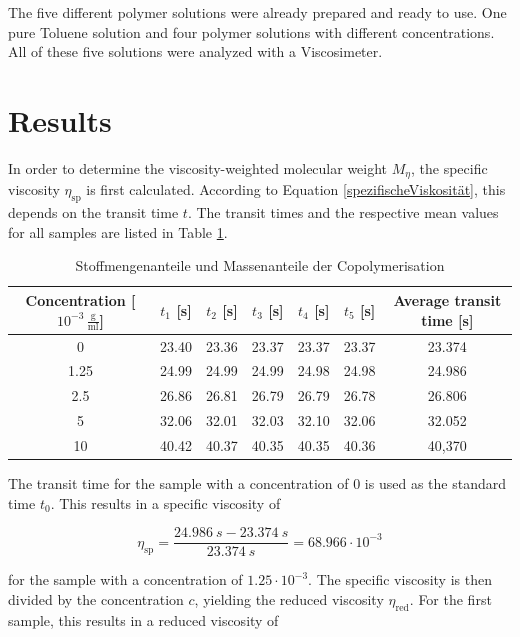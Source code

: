 \documentclass[10pt,a4paper,ngerman]{scrartcl}
\begin{document}
		The five different polymer solutions were already prepared and ready to use. 
		One pure Toluene solution and four polymer solutions with different concentrations.
		All of these five solutions were analyzed with a Viscosimeter.

\section{Results}

		In order to determine the viscosity-weighted molecular weight $M_\eta$, the specific viscosity $\eta_\text{sp}$ is first calculated. 
		According to Equation \eqref{spezifischeViskosität}, this depends on the transit time $t$. The transit times and the respective mean 
		values for all samples are listed in Table \ref{transittimes}. 
		
		\begin{table}[H]
			\centering
			\caption{Stoffmengenanteile und Massenanteile der Copolymerisation}
			\label{transittimes}
			\begin{tabular}{c|ccccc|c}
				\toprule
				Concentration [$10^{-3} \, \frac{\text{g}}{\text{ml}}$]& $t_1$ [s] & $t_2$ [s] & $t_3$ [s] & $t_4$ [s] & $t_5$ [s] & Average transit time [s]\\ 
				\midrule
				0 & 23.40 & 23.36 & 23.37 & 23.37 & 23.37 & 23.374 \\
				1.25 & 24.99 & 24.99 & 24.99 & 24.98 & 24.98 & 24.986 \\
				2.5 & 26.86 & 26.81 & 26.79 & 26.79 & 26.78 & 26.806 \\
				5 & 32.06 & 32.01 & 32.03 & 32.10 & 32.06 & 32.052 \\
				10 & 40.42 & 40.37 & 40.35 & 40.35 & 40.36 & 40,370 \\
				\bottomrule
			\end{tabular}
		\end{table}
		
		The transit time for the sample with a concentration of 0 is used as the standard time $t_0$. This results in a specific viscosity 
		of 
		
		\begin{equation*}
			\eta_\text{sp} = \frac{\SI{24.986}{s} - \SI{23.374}{s}}{\SI{23.374}{s}} = 68.966 \cdot 10^{-3}
		\end{equation*}
		
		for the sample with a concentration of $1.25 \cdot 10^{-3}$. The specific viscosity is then divided by the concentration $c$, yielding the 
		reduced viscosity $\eta_\text{red}$. For the first sample, this results in a reduced viscosity of 
		
\end{document}
